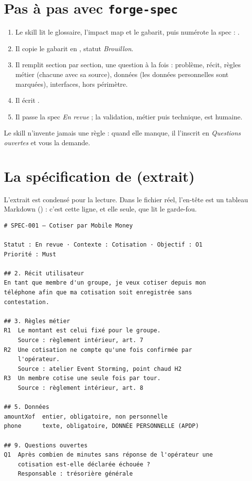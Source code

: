 \section{Pas à pas avec \texttt{forge-spec}}
\begin{enumerate}
  \item Le skill lit le glossaire, l'impact map et le gabarit, puis numérote la spec : .
  \item Il copie le gabarit en , statut \emph{Brouillon}.
  \item Il remplit section par section, une question à la fois : problème, récit, règles métier (chacune avec sa source), données (les données personnelles sont marquées), interfaces, hors périmètre.
  \item Il écrit .
  \item Il passe la spec \emph{En revue} ; la validation, métier puis technique, est humaine.
\end{enumerate}
Le skill n'invente jamais une règle : quand elle manque, il l'inscrit en \emph{Questions ouvertes} et vous la demande.

\section{La spécification de \sika{} (extrait)}
L'extrait est condensé pour la lecture. Dans le fichier réel, l'en-tête est un tableau Markdown () : c'est cette ligne, et elle seule, que lit le garde-fou.

\begin{code}
\begin{Verbatim}
# SPEC-001 — Cotiser par Mobile Money

Statut : En revue · Contexte : Cotisation · Objectif : O1
Priorité : Must

## 2. Récit utilisateur
En tant que membre d'un groupe, je veux cotiser depuis mon
téléphone afin que ma cotisation soit enregistrée sans
contestation.

## 3. Règles métier
R1  Le montant est celui fixé pour le groupe.
    Source : règlement intérieur, art. 7
R2  Une cotisation ne compte qu'une fois confirmée par
    l'opérateur.
    Source : atelier Event Storming, point chaud H2
R3  Un membre cotise une seule fois par tour.
    Source : règlement intérieur, art. 8

## 5. Données
amountXof  entier, obligatoire, non personnelle
phone      texte, obligatoire, DONNÉE PERSONNELLE (APDP)

## 9. Questions ouvertes
Q1  Après combien de minutes sans réponse de l'opérateur une
    cotisation est-elle déclarée échouée ?
    Responsable : trésorière générale
\end{Verbatim}
\end{code}


